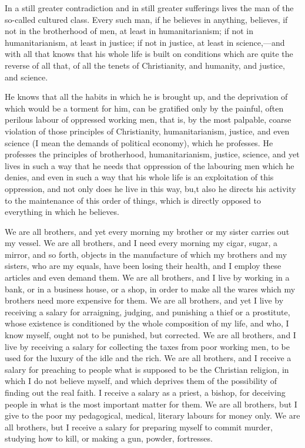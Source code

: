 \documentclass{book}
\begin{document}
In a still greater contradiction and in still greater sufferings lives the man of the so-called cultured class. Every such man, if he believes in anything, believes, if not in the brotherhood of men, at least in humanitarianism; if not in humanitarianism, at least in justice; if not in justice, at least in science,—and with all that knows that his whole life is built on conditions which are quite the reverse of all that, of all the tenets of Christianity, and humanity, and justice, and science.

He knows that all the habits in which he is brought up, and the deprivation of which would be a torment for him, can be gratified only by the painful, often perilous labour of oppressed working men, that is, by the most palpable, coarse violation of those principles of Christianity, humanitarianism, justice, and even science (I mean the demands of political economy), which he professes. He professes the principles of brotherhood, humanitarianism, justice, science, and yet lives in such a way that he needs that oppression of the labouring men which he denies, and even in such a way that his whole life is an exploitation of this oppression, and not only does he live in this way, bu,t also he directs his activity to the maintenance of this order of things, which is directly opposed to everything in which he believes.

We are all brothers, and yet every morning my brother or my sister carries out my vessel. We are all brothers, and I need every morning my cigar, sugar, a mirror, and so forth, objects in the manufacture of which my brothers and my sisters, who are my equals, have been losing their health, and I employ these articles and even demand them. We are all brothers, and I live by working in a bank, or in a business house, or a shop, in order to make all the wares which my brothers need more expensive for them. We are all brothers, and yet I live by receiving a salary for arraigning, judging, and punishing a thief or a prostitute, whose existence is conditioned by the whole composition of my life, and who, I know myself, ought not to be punished, but corrected. We are all brothers, and I live by receiving a salary for collecting the taxes from poor working men, to be used for the luxury of the idle and the rich. We are all brothers, and I receive a salary for preaching to people what is supposed to be the Christian religion, in which I do not believe myself, and which deprives them of the possibility of finding out the real faith. I receive a salary as a priest, a bishop, for deceiving people in what is the most important matter for them. We are all brothers, but I give to the poor my pedagogical, medical, literary labours for money only. We are all brothers, but I receive a salary for preparing myself to commit murder, studying how to kill, or making a gun, powder, fortresses.
\end{document}
